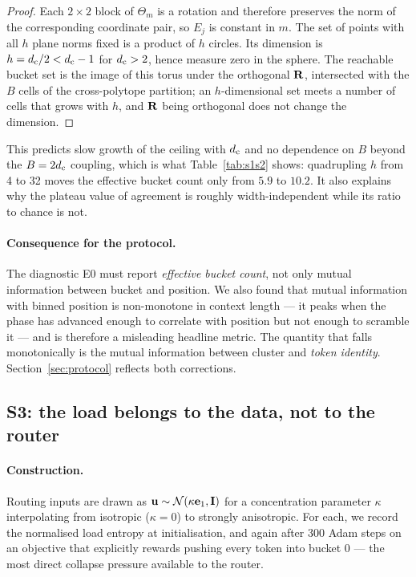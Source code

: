 \begin{proof}
Each $2\times2$ block of $\Theta_m$ is a rotation and therefore preserves the norm of the corresponding coordinate pair, so $E_j$ is constant in $m$. The set of points with all $h$ plane norms fixed is a product of $h$ circles. Its dimension is $h = d_{\mathrm{c}}/2 < d_{\mathrm{c}} - 1$ for $d_{\mathrm{c}} > 2$, hence measure zero in the sphere. The reachable bucket set is the image of this torus under the orthogonal $\mathbf{R}$, intersected with the $B$ cells of the cross-polytope partition; an $h$-dimensional set meets a number of cells that grows with $h$, and $\mathbf{R}$ being orthogonal does not change the dimension.
\end{proof}

This predicts slow growth of the ceiling with $d_{\mathrm{c}}$ and no dependence on $B$ beyond the $B = 2d_{\mathrm{c}}$ coupling, which is what Table~\ref{tab:s1s2} shows: quadrupling $h$ from 4 to 32 moves the effective bucket count only from $5.9$ to $10.2$. It also explains why the plateau value of agreement is roughly width-independent while its ratio to chance is not.

\paragraph{Consequence for the protocol.} The diagnostic E0 must report \emph{effective bucket count}, not only mutual information between bucket and position. We also found that mutual information with binned position is non-monotone in context length --- it peaks when the phase has advanced enough to correlate with position but not enough to scramble it --- and is therefore a misleading headline metric. The quantity that falls monotonically is the mutual information between cluster and \emph{token identity}. Section~\ref{sec:protocol} reflects both corrections.

\subsection{S3: the load belongs to the data, not to the router}
\label{sec:s3}

\paragraph{Construction.} Routing inputs are drawn as $\mathbf{u} \sim \mathcal{N}(\kappa \mathbf{e}_1, \mathbf{I})$ for a concentration parameter $\kappa$ interpolating from isotropic ($\kappa = 0$) to strongly anisotropic. For each, we record the normalised load entropy at initialisation, and again after 300 Adam steps on an objective that explicitly rewards pushing every token into bucket $0$ --- the most direct collapse pressure available to the router.

